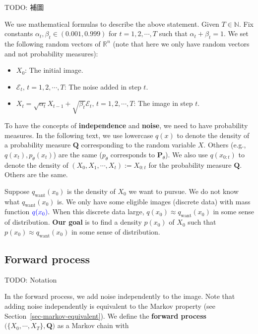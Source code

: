 \documentclass[
]{article}
\providecommand{\tightlist}{%
  \setlength{\itemsep}{0pt}\setlength{\parskip}{0pt}}\usepackage{longtable,booktabs,array}
\theoremstyle{remark}
\begin{document}
TODO: 補圖

We use mathematical formulas to describe the above statement. Given
\(T\in \mathbb N.\) Fix constants \(\alpha_t,\beta_t\in (0.001,0.999)\)
for \(t=1,2,\cdots,T\) such that \(\alpha_t+\beta_t=1.\) We set the
following random vectors of \(\mathbb R^n\) (note that here we only have
random vectors and not probability measures):

\begin{itemize}
\tightlist
\item
  \(X_0\): The initial image.
\item
  \(\mathcal{E}_t,\, t=1,2,\cdots,T\): The noise added in step \(t\).
\item
  \(X_t = \sqrt{\alpha_{t}}X_{t-1} + \sqrt{\beta_t}\mathcal{E}_t,\, t=1,2,\cdots,T\):
  The image in step \(t.\)
\end{itemize}

To have the concepts of \textbf{independence} and \textbf{noise}, we
need to have probability measures. In the following text, we use
lowercase \(q(x)\) to denote the density of a probability measure
\(\mathbf{Q}\) corresponding to the random variable \(X.\) Others (e.g.,
\(q(x_t),p_{\theta}(x_t)\)) are the same (\(p_{\theta}\) corresponds to
\(\mathbf{P}_{\theta}\)). We also use \(q(x_{0:t})\) to denote the
density of \((X_0,X_1,\cdots,X_t):=X_{0:t}\) for the probability measure
\(\mathbf{Q}.\) Others are the same.

Suppose \(q_{\text{want}}(x_0)\) is the density of \(X_0\) we want to
pursue. We do not know what \(q_{\text{want}}(x_0)\) is. We only have
some eligible images (discrete data) with mass function
\({\color{blue}{q(x_0)}}.\) When this discrete data large,
\(q(x_0)\approx q_{\text{want}}(x_0)\) in some sense of distribution.
\textbf{Our goal} is to find a density \(p(x_0)\) of \(X_0\) such that
\(p(x_0)\approx q_{\text{want}}(x_0)\) in some sense of distribution.

\subsection{Forward process}\label{forward-process}

TODO: Notation

In the forward process, we add noise independently to the image. Note
that adding noise independently is equivalent to the Markov property
(see Section~\ref{sec-markov-equivalent}). We define the \textbf{forward
process} \(\bigl( \lbrace X_0,\cdots,X_T\rbrace,\mathbf{Q} \bigr)\) as a
Markov chain with
\end{document}
